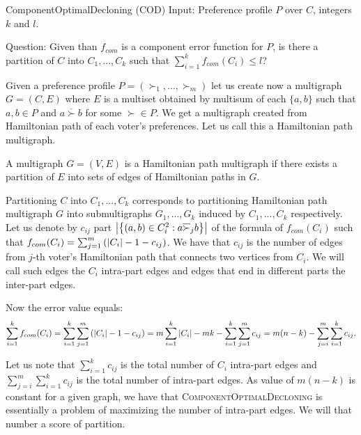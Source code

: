 \begin{problem}{ComponentOptimalDecloning (COD)}
	Input: Preference profile $P$ over $C$, integers $k$ and $l$.

	Question: Given than $f_{com}$ is a component error function for $P$,
		is there a partition of $C$ into $C_1, ..., C_k$ such that $\sum_{i=1}^k f_{com}(C_i) \leq l$?
\end{problem}

Given a preference profile $P = (\succ_1, ..., \succ_m)$ let us create now a multigraph $G=(C,E)$
where $E$ is a multiset obtained by multisum
of each $\{a,b\}$ such that $a,b \in P$ and $a \overline{\succ} b$ for some $\succ \in P$.
We get a multigraph created from Hamiltonian path of each voter's preferences.
Let us call this a Hamiltonian path multigraph.

\begin{defn}
A multigraph $G=(V,E)$ is a Hamiltonian path multigraph if there exists a partition of $E$
into sets of edges of Hamiltonian paths in $G$.
\end{defn}

Partitioning $C$ into $C_1,...,C_k$ corresponds to
partitioning Hamiltonian path multigraph $G$ into submultigraphs $G_1,...,G_k$
induced by $C_1,...,C_k$ respectively.
Let us denote by $c_{ij}$ part
$\left\vert \left\lbrace \left( a,b \right) \in C_i^2 : a \overline{\succ}_j b \right\rbrace  \right\vert$
of the formula of $f_{com}(C_i)$ such that
$f_{com}(C_i) = \sum_{j=1}^m \left( \left\vert C_i \right\vert - 1 - c_{ij} \right)$.
We have that $c_{ij}$ is the number of edges from $j$-th voter's Hamiltonian path
that connects two vertices from $C_i$.
We will call such edges the $C_i$ intra-part edges and edges that end in different parts the inter-part edges.

Now the error value equals:
$$
\sum_{i=1}^k f_{com}(C_i) =
\sum_{i=1}^k \sum_{j=1}^m \left( \left\vert C_i \right\vert - 1 - c_{ij} \right) =
m \sum_{i=1}^k \left\vert C_i \right\vert - m k - \sum_{i=1}^k \sum_{j=1}^m c_{ij} =
m(n-k) - \sum_{j=i}^m \sum_{i=1}^k c_{ij}
\text{.}$$

Let us note that $\sum_{i=1}^k c_{ij}$ is the total number of $C_i$ intra-part edges
and $\sum_{j=i}^m \sum_{i=1}^k c_{ij}$ is the total number of intra-part edges.
As value of $m(n-k)$ is constant for a given graph,
we have that \textsc{ComponentOptimalDecloning} is essentially a problem of maximizing the number of intra-part edges.
We will that number a score of partition.


